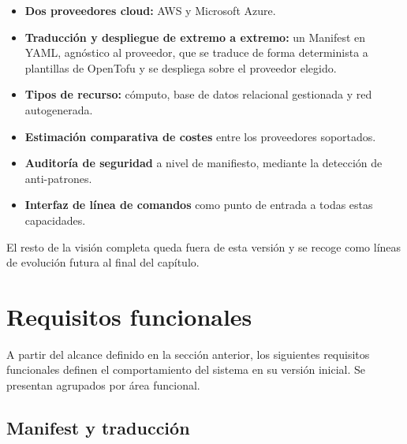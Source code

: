 \begin{itemize}
    \item \textbf{Dos proveedores cloud:} AWS y Microsoft Azure.
    \item \textbf{Traducción y despliegue de extremo a extremo:} un Manifest en YAML,
    agnóstico al proveedor, que se traduce de forma determinista a plantillas de OpenTofu
    y se despliega sobre el proveedor elegido.
    \item \textbf{Tipos de recurso:} cómputo, base de datos relacional gestionada y red
    autogenerada.
    \item \textbf{Estimación comparativa de costes} entre los proveedores soportados.
    \item \textbf{Auditoría de seguridad} a nivel de manifiesto, mediante la detección de
    anti-patrones.
    \item \textbf{Interfaz de línea de comandos} como punto de entrada a todas estas
    capacidades.
\end{itemize}

El resto de la visión completa queda fuera de esta versión y se recoge como líneas de
evolución futura al final del capítulo.

\section{Requisitos funcionales}

A partir del alcance definido en la sección anterior, los siguientes requisitos
funcionales definen el comportamiento del sistema en su versión inicial. Se presentan
agrupados por área funcional.

\subsection{Manifest y traducción}

